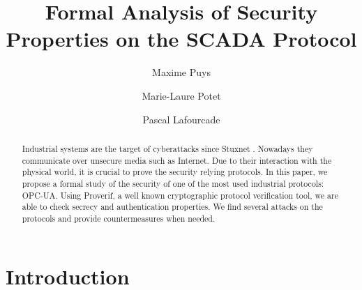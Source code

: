 \documentclass{llncs}
\title{Formal Analysis of Security Properties on the \opcua SCADA Protocol}
\author{Maxime Puys \and Marie-Laure Potet \and Pascal Lafourcade}
\date{}
\newcommand{\opcua}{OPC-UA\xspace}
\newcommand{\modbus}{MODBUS\xspace}
\begin{document}
\maketitle

\begin{abstract}
    Industrial systems are the target of cyberattacks since Stuxnet
    \cite{Lan11}.  Nowadays they communicate over unsecure media such
    as Internet.  Due to their interaction with the physical world, it
    is crucial to prove the security relying protocols.  In this
    paper, we propose a formal study of the security of one of the
    most used industrial protocols: \opcua.  Using
    Proverif, a well known cryptographic protocol verification tool,
    we are able to check secrecy and authentication properties.  We
    find several attacks on the protocols and provide countermeasures
    when needed.
\end{abstract}

\section{Introduction}


%
%
%



\end{document}
